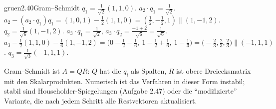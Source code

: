 \begin{loesungkarte}{gruen}{2.40}{Gram--Schmidt}
$q_1 = \frac1{\sqrt2}(1, 1, 0)$.
$a_2\cdot q_1 = \frac1{\sqrt2}$. $a_2 - (a_2\cdot q_1)q_1 = (1, 0, 1) - \frac12(1, 1, 0) = (\frac12, -\frac12, 1)\parallel(1, -1, 2)$. $q_2 = \frac1{\sqrt6}(1, -1, 2)$.
$a_3\cdot q_1 = \frac1{\sqrt2}$, $a_3\cdot q_2 = \frac{-1 + 2}{\sqrt6} = \frac1{\sqrt6}$. $a_3 - \frac12(1, 1, 0) - \frac16(1, -1, 2) = \bigl(0 - \frac12 - \frac16,\ 1 - \frac12 + \frac16,\ 1 - \frac13\bigr) = \bigl(-\frac23, \frac23, \frac23\bigr)\parallel(-1, 1, 1)$. $q_3 = \frac1{\sqrt3}(-1, 1, 1)$.
\begin{mitnehmen}\kastentext
Gram--Schmidt ist $A = QR$: $Q$ hat die $q_i$ als Spalten, $R$ ist obere Dreiecksmatrix mit den Skalarprodukten. Numerisch ist das Verfahren in dieser Form instabil; stabil sind Householder-Spiegelungen (Aufgabe 2.47) oder die \enquote{modifizierte} Variante, die nach jedem Schritt alle Restvektoren aktualisiert.
\end{mitnehmen}
\end{loesungkarte}

